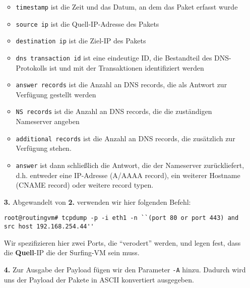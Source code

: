 \documentclass{scrartcl}
\begin{document}
\begin{enumerate}
                      \begin{itemize}
                          \item \texttt{timestamp} ist die Zeit und das Datum, an dem das Paket
                                erfasst wurde
                          \item \texttt{source ip} ist die Quell-IP-Adresse des Pakets
                          \item \texttt{destination ip} ist die Ziel-IP des Pakets
                          \item \texttt{dns transaction id} ist eine eindeutige ID,
                                die Bestandteil des DNS-Protokolls ist und mit der
                                Transaktionen identifiziert werden
                          \item \texttt{answer records} ist die Anzahl an DNS records,
                                die als Antwort zur Verfügung gestellt werden
                          \item \texttt{NS records} ist die Anzahl an DNS records,
                                die die zuständigen Nameserver angeben
                          \item \texttt{additional records} ist die Anzahl an DNS records,
                                die zusätzlich zur Verfügung stehen.
                          \item \texttt{answer} ist dann schließlich die Antwort, die der
                                Nameserver zurückliefert, d.h. entweder eine IP-Adresse
                                (A/AAAA record), ein weiterer Hostname (CNAME record)
                                oder weitere record typen.
                      \end{itemize}

        \item[\bf 3.] Abgewandelt von \textbf{2.} verwenden wir hier folgenden Befehl:
                      \begin{lstlisting}[style=BashInputStyle]
root@routingvm# tcpdump -p -i eth1 -n ``(port 80 or port 443) and src host 192.168.254.44''
                      \end{lstlisting}

                      Wir spezifizieren hier zwei Ports, die ``verodert'' werden,
                      und legen fest, dass die \textbf{Quell}-IP die der Surfing-VM
                      sein muss.

        \item[\bf 4.] Zur Ausgabe der Payload fügen wir den Parameter \texttt{-A}
                      hinzu. Dadurch wird uns der Payload der Pakete in ASCII
                      konvertiert ausgegeben.


\end{enumerate}
\end{document}
